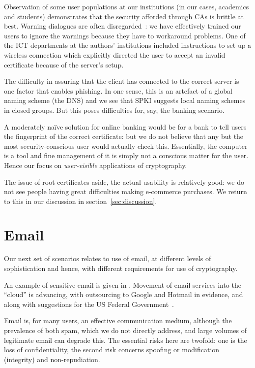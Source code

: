 \documentclass{article}
\def\citeN{\citet}
\def\cite{\citep}
\newenvironment{userstories}{\begin{description}}{\end{description}}
\begin{document}
Observation of some user populations at our institutions (in our
cases, academics and students) demonstrates that the security afforded
through CAs is brittle at best.  Warning dialogues are often
disregarded~\cite{Likarish+08}: we have effectively trained our users
to ignore the warnings because they have to workaround problems.  One
of the ICT departments at the authors' institutions included
instructions to set up a wireless connection which explicitly
directed the user to accept an invalid certificate because of the
server's setup.

The difficulty in assuring that the client has
connected to the correct server is one factor that enables phishing.
In one sense, this is an artefact of a global naming scheme (the DNS)
and we see that SPKI suggests local naming schemes in closed groups.
But this poses difficulties for, say, the banking scenario.

A moderately na\"ive solution for online banking would be for a bank to
tell users the fingerprint of the correct certificate: but we do not
believe that any but the most security-conscious user would actually
check this.  Essentially, the computer is a tool and fine management
of it is simply not a conscious matter for the user.  Hence our focus on \emph{user-visible} applications of cryptography.

The issue of root certificates aside, the actual usability is
relatively good: we do not see people having great difficulties making
e-commerce purchases.
We return to this in our discussion in section~\ref{sec:discussion}.


\section{Email}\label{sec:email}
Our next set of scenarios relates to use of email, at different levels of
sophistication and hence, with different requirements for use of
cryptography.

\begin{userstories}
\USAesocial
\USAesensitive
\USAecontract
\end{userstories}
An example of sensitive email is given in \citeN{Gaw+06}.  Movement of
email services into the ``cloud'' is advancing, with outsourcing to
Google and Hotmail in evidence, and along with suggestions for the US Federal Government~\cite{mSaaSemail}.

Email is, for many users, an effective communication medium, although
the prevalence of both spam, which we do not directly address, and
large volumes of legitimate email can degrade this.  The essential
risks here are twofold: one is the loss of confidentiality, the second
risk concerns spoofing or modification  (integrity) and non-repudiation.
\end{document}
